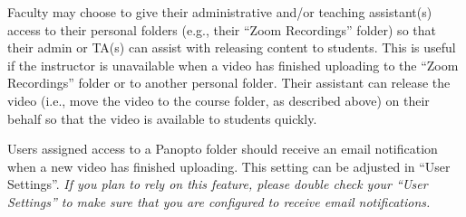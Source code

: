 \begin{note}
	Faculty may choose to give their administrative and/or teaching assistant(s) access to their personal folders (e.g., their ``Zoom Recordings'' folder) so that their admin or TA(s) can assist with releasing content to students. This is useful if the instructor is unavailable when a video has finished uploading to the ``Zoom Recordings'' folder or to another personal folder. Their assistant can release the video (i.e., move the video to the course folder, as described above) on their behalf so that the video is available to students quickly.
\end{note}

\begin{note}
		Users assigned access to a Panopto folder should receive an email notification when a new video has finished uploading. This setting can be adjusted in ``User Settings''. \textit{If you plan to rely on this feature, please double check your ``User Settings'' to make sure that you are configured to receive email notifications.}
\end{note}
